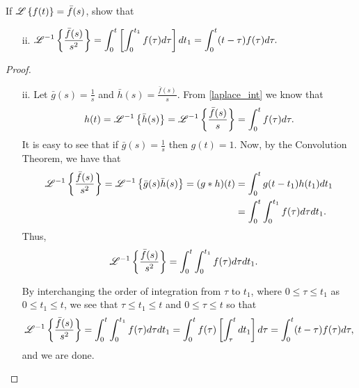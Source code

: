 \begin{problem}{3.12}
  If $\mathscr{L}\left\{ {f(t)} \right\} = \bar{f}(s)$, show that
  \begin{enumerate}
    \item[ii.] $\displaystyle \mathscr{L}^{-1}\left\{ {\frac{\bar{f}(s)}{s^2}} \right\} = \int_0^t \left[\int_0^{t_1} f(\tau) d\tau\right] dt_1 = \int_0^t (t-\tau)f(\tau) d\tau.$
  \end{enumerate}
\end{problem}

\begin{proof}
  \begin{enumerate}
    \item[ii.] Let $\displaystyle \bar{g}(s) = \frac{1}{s}$ and $\bar{h}(s) = \frac{\bar{f}(s)}{s}$.
      From \eqref{laplace_int} we know that
      \begin{align*}
        h(t) = \mathscr{L}^{-1}\left\{ {\bar{h}(s)} \right\} = \mathscr{L}^{-1}\left\{ {\frac{\bar{f}(s)}{s}} \right\} = \int_0^t f(\tau) d\tau.
      \end{align*}
      It is easy to see that if $\displaystyle \bar{g}(s) = \frac{1}{s}$ then $g(t) = 1$.
      Now, by the Convolution Theorem, we have that
      \begin{align*}
        \mathscr{L}^{-1}\left\{ {\frac{\bar{f}(s)}{s^2}} \right\} = \mathscr{L}^{-1}\left\{ {\bar{g}(s)\bar{h}(s)} \right\}
        = (g \ast h)(t)
        &= \int_0 ^t g(t - t_1)h(t_1) dt_1 \\
        &= \int_0^t \int_0^{t_1} f(\tau) d\tau dt_1.
      \end{align*}
      Thus,
      \begin{align}\label{int_12}
        \mathscr{L}^{-1}\left\{ {\frac{\bar{f}(s)}{s^2}} \right\}
        &= \int_0^t \int_0^{t_1} f(\tau) d\tau dt_1.
      \end{align}

      By interchanging the order of integration from $\tau$ to $t_1$, where $0 \leq \tau \leq t_1$
      as $0 \leq t_1 \leq t$, we see that $\tau \leq t_1 \leq t$ and $0 \leq \tau \leq t$ so that
      \begin{align*}
        \mathscr{L}^{-1}\left\{ {\frac{\bar{f}(s)}{s^2}} \right\}
        = \int_0^t \int_0^{t_1} f(\tau) d\tau dt_1
        = \int_0^t f(\tau) \left[\int_\tau^t dt_1\right] d\tau
        = \int_0^t (t-\tau) f(\tau) d\tau,
      \end{align*}
      and we are done.
  \end{enumerate}
\end{proof}
\newpage
